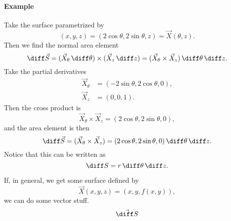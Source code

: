 \documentclass{multi}
\begin{document}
\paragraph{Example}

Take the surface parametrized by
\[
    (x, y, z) = (2 \cos \theta, 2 \sin \theta, z) = \vec X(\theta, z).
\]
Then we find the normal area element
\[
    \diff \vec S = (\vec X_\theta \, \diff \theta) \times (\vec X_z \, \diff z)
    = (\vec X_\theta \times \vec X_z) \, \diff \theta \, \diff z.
\]
Take the partial derivatives
\begin{align*}
    \vec X_\theta &= (-2 \sin \theta, 2 \cos \theta, 0), \\
    \vec X_z &= (0, 0, 1).
\end{align*}
Then the cross product is
\[
    \vec X_\theta \times \vec X_z = (2 \cos \theta, 2 \sin \theta, 0),
\]
and the area element is then
\[
    \diff \vec S = (\vec X_\theta \times \vec X_z) = (2 \cos \theta, 2 \sin \theta, 0) \, \diff \theta \, \diff z.
\]
Notice that this can be written as
\[
    \diff S = r \, \diff \theta \, \diff z.
\]

If, in general, we get some surface defined by
\[
    \vec X(x, y, z) = (x, y, f(x, y)),
\]
we can do some vector stuff.
\[
    \vec{\diff S}
\]
\end{document}
